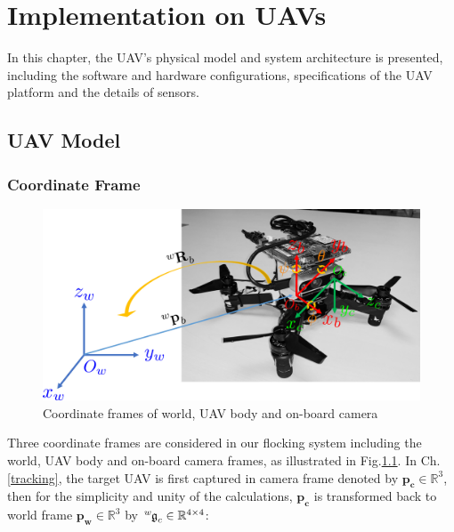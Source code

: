 \chapter{Implementation on UAVs}\label{implementation}

In this chapter, the UAV's physical model and system architecture is presented, including the software and hardware configurations, specifications of the UAV platform and the details of sensors.

\section{UAV Model}

\subsection{Coordinate Frame}

\begin{figure}[htb]
  \centering
  \includegraphics[width=1.0\textwidth]{figure/chapter_4/coordinate.png}
  \caption{Coordinate frames of world, UAV body and on-board camera}
  \label{fig:coordinate}
\end{figure}

Three coordinate frames are considered in our flocking system including the world, UAV body and on-board camera frames, as illustrated in Fig.\ref{fig:coordinate}. In Ch.\ref{tracking}, the target UAV is first captured in camera frame denoted by $\mathbf{p_c}\in\mathbb{R}^3$, then for the simplicity and unity of the calculations, $\mathbf{p_c}$ is transformed back to world frame $\mathbf{p_w}\in\mathbb{R}^3$ by $\tensor*[^w]{\mathfrak{g}}{_c}\in\mathbb{R}^{4\times4}$:

